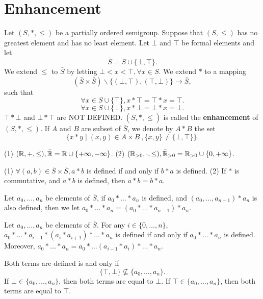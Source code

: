 \section{Enhancement}
\begin{definitionenv}
    Let $(S,*,\le)$ be a partially ordered semigroup. Suppose that $(S,\le )$ has no greatest element and has no least element. Let $\bot$ and $\top$ be formal elements and let 
    $$\bar{S}=S\cup\{\bot,\top\}.$$
    We extend $\le $ to $\bar{S}$ by letting $\bot<x<\top,\forall x\in S$. We extend $*$ to a mapping
    $$\left(\bar{S}\times\bar{S}\right)\backslash \{(\bot,\top),(\top,\bot)\}\longrightarrow \bar{S},$$
    such that 
    $$\forall x\in S\cup\{\top\},x*\top=\top*x=\top.$$
    $$\forall x\in S\cup\{\bot\},x*\bot=\bot*x=\bot.$$
    $\top*\bot$ and $\bot*\top$ are NOT DEFINED. $(\bar{S},*,\le)$ is called the \textbf{enhancement} of $(S,*,\le)$. If $A$ and $B$ are subset of $\bar{S}$, we denote by $A*B$ the set 
    $$\{x*y\mid (x,y)\in A\times B\ ,\{x,y\}\not=\{\bot,\top\}\}.$$
\end{definitionenv}
\begin{exampleenv}
    \quad 
    \newline
    (1) $(\mathbb{R},+,\le ), \bar{\mathbb{R}}=\mathbb{R}\cup\{+\infty,-\infty\}$.
    \newline
    (2) $(\mathbb{R}_{>0},\cdot,\le),\bar{\mathbb{R}}_{>0}=\mathbb{R}_{>0}\cup\{0,+\infty\}$.
\end{exampleenv}
\begin{remark}
    \quad 
    \newline
    (1) $\forall (a,b)\in \bar{S}\times \bar{S}, a*b$ is defined if and only if $b*a$ is defined. 
    \newline
    (2) If $*$ is commutative, and $a*b$ is defined, then $a*b=b*a$.
\end{remark}
\begin{definitionenv}
    Let $a_0,\dots,a_n$ be elements of $\bar{S}$, if $a_0*\dots*a_n$ is defined, and $(a_0,\dots,a_{n-1})*a_n$ is also defined, then we let $a_0*\dots*a_n=\left(a_0*\dots*a_{n-1}\right)*a_n$.
\end{definitionenv}
\begin{propositionenv}
    Let $a_0,\dots,a_n$ be elements of $\bar{S}$. For any $i\in \{0,\dots,n\}$, $a_0*\dots*a_{i-1}*(a_i*a_{i+1})*\dots*a_n$ is defined if and only if $a_0*\dots*a_n$ is defined. Moreover, $a_0*\dots*a_n=a_0*\dots (a_{i-1}*a_i)*\dots*a_n $.
\end{propositionenv}
\begin{proofenv}
    Both terms are defined is and only if 
    $$\{\top,\bot\}\nsubseteq\{a_0,\dots,a_n\}.$$
    If $\bot\in\{a_0,\dots,a_n\}$, then both terms are equal to $\bot$. If $\top\in\{a_0,\dots,a_n\}$, then both terms are equal to $\top$. 
\end{proofenv}
